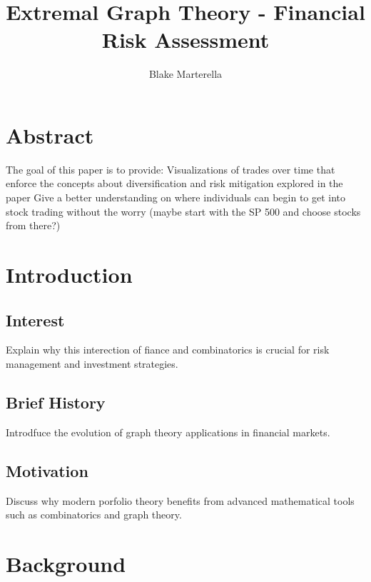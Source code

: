 \documentclass{article}
\begin{document}
\title{Extremal Graph Theory - Financial Risk Assessment}
\author{Blake Marterella}
\date{}

\maketitle

\section*{Abstract}
The goal of this paper is to provide:
Visualizations of trades over time that enforce the concepts about diversification and risk mitigation explored in the paper
Give a better understanding on where individuals can begin to get into stock trading without the worry (maybe start with the SP 500 and choose stocks from there?)

\tableofcontents

\section{Introduction}

\subsection{Interest}

Explain why this interection of fiance and combinatorics is crucial for risk management and investment strategies.

\subsection{Brief History}

Introdfuce the evolution of graph theory applications in financial markets. 

\subsection{Motivation}

Discuss why modern porfolio theory benefits from advanced mathematical tools such as combinatorics and graph theory.


\section{Background}
\end{document}
